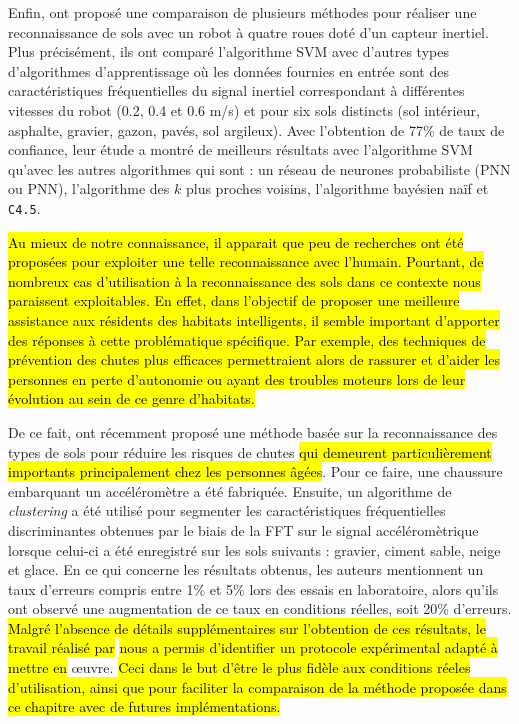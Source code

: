 Enfin, \cite{Weiss2007} ont proposé une comparaison de plusieurs méthodes pour réaliser une reconnaissance de sols avec un robot à quatre roues doté d'un capteur inertiel. Plus précisément, ils ont comparé l'algorithme \acs{SVM} avec d'autres types d'algorithmes d'apprentissage où les données fournies en entrée sont des caractéristiques fréquentielles du signal inertiel correspondant à différentes vitesses du robot (0.2, 0.4 et 0.6 m/s) et pour six sols distincts (sol intérieur, asphalte, gravier, gazon, pavés, sol argileux). Avec l'obtention de 77\% de taux de confiance, leur étude a montré de meilleurs résultats avec l'algorithme \acs{SVM} qu'avec les autres algorithmes qui sont : un réseau de neurones probabiliste (\acl{PNN} ou \acs{PNN}), l'algorithme des $k$ plus proches voisins, l'algorithme bayésien naïf et \texttt{C4.5}.

\hl{Au mieux de notre connaissance, il apparait que peu de recherches ont été proposées pour exploiter une telle reconnaissance avec l'humain. Pourtant, de nombreux cas d'utilisation à la reconnaissance des sols dans ce contexte nous paraissent exploitables. En effet, dans l'objectif de proposer une meilleure assistance aux résidents des habitats intelligents, il semble important d'apporter des réponses à cette problématique spécifique. Par exemple, des techniques de prévention des chutes plus efficaces permettraient alors de rassurer et d'aider les personnes en perte d'autonomie ou ayant des troubles moteurs lors de leur évolution au sein de ce genre d'habitats.}

De ce fait, \cite{Otis2016} ont récemment proposé une méthode basée sur la reconnaissance des types de sols pour réduire les risques de chutes \hl{qui demeurent particulièrement importants principalement chez les personnes âgées}. Pour ce faire, une chaussure embarquant un accéléromètre a été fabriquée. Ensuite, un algorithme de \textit{clustering} a été utilisé pour segmenter les caractéristiques fréquentielles discriminantes obtenues par le biais de la \acs{FFT} sur le signal accéléromètrique lorsque celui-ci a été enregistré sur les sols suivants : gravier, ciment sable, neige et glace. En ce qui concerne les résultats obtenus, les auteurs mentionnent un taux d'erreurs compris entre 1\% et 5\% lors des essais en laboratoire, alors qu'ils ont observé une augmentation de ce taux en conditions réelles, soit 20\% d'erreurs. \hl{Malgré l'absence de détails supplémentaires sur l'obtention de ces résultats, le travail réalisé par} \cite{Otis2016} \hl{nous a permis d'identifier un protocole expérimental adapté à mettre en} \oe{}uvre. \hl{Ceci dans le but d'être le plus fidèle aux conditions réeles d'utilisation, ainsi que pour faciliter la comparaison de la méthode proposée dans ce chapitre avec de futures implémentations.}

